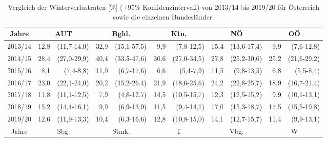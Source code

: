\begin{table}[H]
    \caption{Vergleich der Winterverlustraten [\%] (\(\pm \)95\% Konfidenzintervall) von 2013/14 bis 2019/20 für Österreich sowie die einzelnen Bundesländer.}
    \centering
    \scriptsize
    \label{tab:u:states-year}
    \begin{tabular}{c|*{4}{rr|}rr}
        \toprule    
        \multicolumn{1}{c|}{Jahre} & 
        \multicolumn{2}{c|}{AUT}   & 
        \multicolumn{2}{c|}{Bgld.} & 
        \multicolumn{2}{c|}{Ktn.}  &  
        \multicolumn{2}{c|}{NÖ}    & 
        \multicolumn{2}{c}{OÖ}    \\
        \midrule
        
	    2013/14 & 12,8 & (11,7-14,0) & 32,9 & (15,1-57,5) &  9,9 &  (7,8-12,5) & 15,4 & (13,6-17,4) &  9,9 &  (7,6-12,8) \\
        2014/15 & 28,4 & (27,0-29,9) & 40,4 & (33,5-47,6) & 30,6 & (27,0-34,5) & 27,8 & (25,2-30,6) & 25,2 & (21,6-29,2) \\
        2015/16 &  8,1 &   (7,4-8,8) & 11,0 &  (6,7-17,6) &  6,6 &   (5,4-7,9) & 11,5 &  (9,8-13,5) &  6,8 &   (5,5-8,4) \\
        2016/17 & 23,0 & (22,1-24,0) & 20,2 & (15,2-26,4) & 21,9 & (18,6-25,6) & 24,2 & (22,8-25,7) & 18,9 & (16,7-21,4) \\
        2017/18 & 11,8 & (11,1-12,5) &  7,9 &  (4,8-12,7) & 14,5 & (10,5-15,7) & 12,3 & (12,5-15,2) &  9,9 & (10,1-13,1) \\
        2018/19 & 15,2 & (14,4-16,1) &  9,9 &  (6,9-13,9) & 11,5 &  (9,4-14,1) & 17,0 & (15,3-18,7) & 17,5 & (15,5-19,8) \\
        2019/20 & 12,6 & (11,9-13,3) & 10,4 &  (6,3-16,6) & 12,8 & (10,8-15,0) & 14,1 & (12,7-15,7) & 11,4 &  (9,9-13,1) \\

        \midrule    
        \multicolumn{1}{c|}{Jahre} & 
        \multicolumn{2}{c|}{Sbg.}  & 
        \multicolumn{2}{c|}{Stmk.} &
        \multicolumn{2}{c|}{T}     &
        \multicolumn{2}{c|}{Vbg.}  &
        \multicolumn{2}{c}{W}     \\
        \midrule


\end{tabular}
\end{table}
